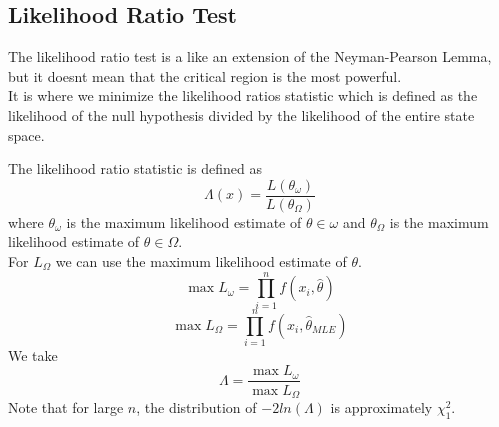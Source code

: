 \documentclass[answers,12pt,addpoints]{exam}
\begin{document}
\subsection{Likelihood Ratio Test}
\begin{definition}
    The likelihood ratio test is a like an extension of the Neyman-Pearson Lemma, but it doesnt mean that the critical region is the most powerful.\\
    It is where we minimize the likelihood ratios statistic which is defined as the likelihood of the null hypothesis divided by the likelihood of the entire state space.
\end{definition}
\begin{definition}
    The likelihood ratio statistic is defined as 
    $$ \Lambda(x) = \frac{L(\theta_{\omega})}{L(\theta_{\Omega})} $$
    where $\theta_{\omega}$ is the maximum likelihood estimate of $\theta \in \omega$ and $\theta_{\Omega}$ is the maximum likelihood estimate of $\theta \in \Omega$.\\
    For $L_{\Omega}$ we can use the maximum likelihood estimate of $\theta$.
    $$ \max L_{\omega} = \prod_{i=1}^{n} f(x_i, \hat{\theta})$$
    $$ \max L_{\Omega} = \prod_{i=1}^{n} f(x_i, \hat{\theta}_{MLE})$$
    We take 
    $$ \Lambda = \frac{\max L_{\omega}}{\max L_{\Omega}}$$
    Note that for large $n$, the distribution of $-2 ln(\Lambda)$ is approximately $\chi^2_1$.
\end{definition}
\end{document}
